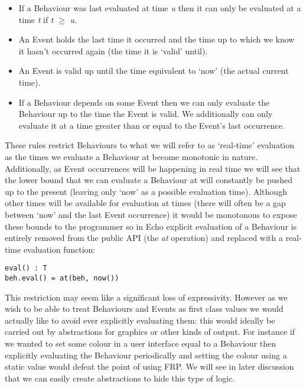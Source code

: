     \begin{itemize}
      \item If a Behaviour was last evaluated at time \emph{u} then it can only be evaluated at
      a time \emph{t} if \emph{t} $\geq$ \emph{u}.
      \item An Event holds the last time it occurred and the time up to which we know it hasn't occurred
      again (the time it is `valid' until).
      \item An Event is valid up until the time equivalent to `now' (the actual current time).
      \item If a Behaviour depends on some Event then we can only evaluate the Behaviour up to
      the time the Event is valid. We additionally can only evaluate it at a time greater than
      or equal to the Event's last occurrence.
    \end{itemize}
    
    These rules restrict Behaviours to what we will refer to as `real-time' evaluation as the times
    we evaluate a Behaviour at become monotonic in nature. Additionally, as Event occurrences will
    be happening in real time we will see that the lower bound that we can evaluate a Behaviour at will
    constantly be pushed up to the present (leaving only `now' as a possible evaluation time). Although
    other times will be available for evaluation at times (there will often be a gap between `now' and
    the last Event occurrence) it would be monotonous to expose these bounds to the programmer so
    in Echo explicit evaluation of a Behaviour is entirely removed from the public API (the
    \emph{at} operation) and replaced with a real-time evaluation function:

\begin{verbatim}
eval() : T
beh.eval() = at(beh, now())
\end{verbatim}  

    This restriction may seem like a significant loss of expressivity. However as we wish to be able to treat
    Behaviours and Events as first class values we would actually like to avoid ever explicitly evaluating
    them: this would ideally be carried out by abstractions for graphics or other kinds of output. For instance
    if we wanted to set some colour in a user interface equal to a Behaviour then explicitly evaluating the Behaviour
    periodically and setting the colour using a static value would defeat the point of using FRP. We will see in later
    discussion that we can easily create abstractions to hide this type of logic.
    
